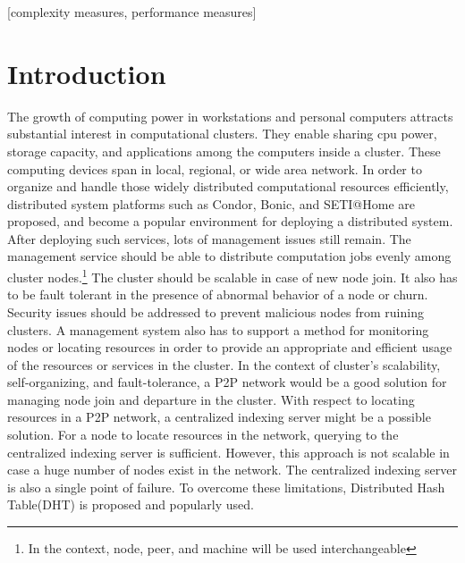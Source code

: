 \documentclass{acm_proc_article-sp}
\begin{document}
[complexity measures, performance measures]



\section{Introduction}
The growth of computing power in workstations and personal computers attracts substantial interest in computational clusters\cite{bonic}\cite{condor}\cite{setiathome}.
They enable sharing cpu power, storage capacity, and applications among the computers inside a cluster. These computing devices span in local, regional, or wide area network.
In order to organize and handle those widely distributed computational resources efficiently, distributed system platforms such as Condor\cite{condor}, Bonic\cite{bonic}, and SETI@Home\cite{setiathome} are proposed, 
and become a popular environment for deploying a distributed system.
After deploying such services, lots of management issues still remain. The management service should be able to distribute computation jobs evenly among cluster nodes.\footnote{In the context, node, peer, and machine will be used interchangeable}
The cluster should be scalable in case of new node join. It also has to be fault tolerant in the presence of abnormal behavior of a node or churn. 
Security issues should be addressed to prevent malicious nodes from ruining clusters.
A management system also has to support a method for monitoring nodes or locating resources in order to provide an appropriate and efficient usage of the resources or services in the cluster.
In the context of cluster's scalability, self-organizing, and fault-tolerance, a P2P network\cite{chord}\cite{pastry}\cite{can}\cite{bamboo} would be a good solution for managing node join and departure in the cluster. 
With respect to locating resources in a P2P network, a centralized indexing server might be a possible solution. 
For a node to locate resources in the network, querying to the centralized indexing server is sufficient. However, this approach is not scalable in case a huge number of nodes exist in the network.
The centralized indexing server is also a single point of failure. To overcome these limitations, Distributed Hash Table(DHT) is proposed and popularly used.
\end{document}
